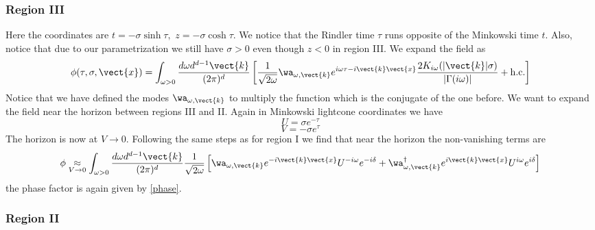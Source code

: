 \subsubsection{Region III}

Here the coordinates are $t= -\sigma \sinh \tau,\,\,z=-\sigma \cosh \tau$. We notice that the Rindler time $\tau$ runs opposite of the Minkowski time $t$. Also,
notice that due to our parametrization we still have $\sigma>0$ even though $z<0$ in region III. We expand the field as
\[
\phi(\tau,\sigma,\vect{x}) = \int_{\omega>0}{d\omega d^{d-1}\vect{k} \over (2 \pi)^d} \left[{1\over \sqrt{2\omega}} \wa_{\omega,\vect{k}} e^{i\omega \tau-i \vect{k} \vect{x}}{2 K_{i\omega}(|\vect{k}| \sigma)
\over |\Gamma(i\omega)|} + {\rm h.c.} \right]
\]
Notice that we have defined the modes $\wa_{\omega,\vect{k}}$ to multiply the function which is the conjugate of the one before.
We want to expand the field near the horizon between regions III and II. Again in Minkowski lightcone coordinates we have
\[
U = \sigma e^{-\tau}
\]
\[
V = -\sigma e^\tau
\]
The horizon is now at $V\rightarrow 0$. Following the same steps as for region I we find that near the horizon the non-vanishing terms are
\begin{equation}
\label{boundaryIIandIII}
\phi \underset{V \rightarrow 0}{\approx} \int_{\omega>0}{d\omega d^{d-1}\vect{k} \over (2 \pi)^d} {1\over \sqrt{2\omega}}\left[ \wa_{\omega,\vect{k}} e^{-i \vect{k} \vect{x}} U^{-i\omega} e^{-i\delta}
+\wa^\dagger_{\omega,\vect{k}} e^{i\vect{k}\vect{x}} U^{i\omega}e^{i\delta}   \right]
\end{equation}
the phase factor is again given by \eqref{phase}.

\subsubsection{Region II}

